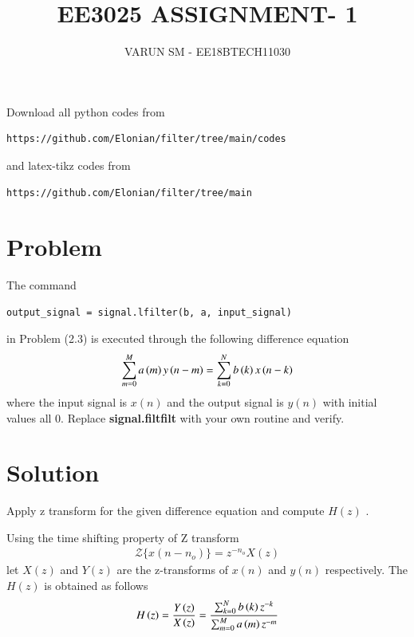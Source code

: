 \documentclass[journal,12pt,twocolumn]{IEEEtran}
\begin{document}
     \def\rightbox#1{\makebox[0in][r]{#1}}
     \def\centbox#1{\makebox[0in]{#1}}
     \def\topbox#1{\raisebox{-\baselineskip}[0in][0in]{#1}}
     \def\midbox#1{\raisebox{-0.5\baselineskip}[0in][0in]{#1}}
\vspace{3cm}
\title{EE3025 ASSIGNMENT- 1}
\author{VARUN SM - EE18BTECH11030}
\maketitle
\newpage
\bigskip
\renewcommand{\thefigure}{\theenumi}
\renewcommand{\thetable}{\theenumi}
Download all python codes from 
\begin{lstlisting}
https://github.com/Elonian/filter/tree/main/codes
\end{lstlisting}
%
and latex-tikz codes from 
%
\begin{lstlisting}
https://github.com/Elonian/filter/tree/main
\end{lstlisting}
\section{Problem}
The command
\begin{lstlisting}
output_signal = signal.lfilter(b, a, input_signal)
\end{lstlisting}
in Problem (2.3) is executed through the following difference equation
\begin{equation}
\label{ee18btech11030}
 \sum _{m=0}^{M}a\brak{m}y\brak{n-m}=\sum _{k=0}^{N}b\brak{k}x\brak{n-k}
\end{equation}
where the input signal is $x(n)$ and the output signal is $y(n)$ with initial values all 0. Replace
\textbf{signal.filtfilt} with your own routine and verify.
\section{Solution}
Apply z transform for the given difference equation and compute $H(z)$ .

Using the time shifting property of Z transform 
  \begin{align}
      {\mathcal {Z}}\{x(n-n_o)\} = z^{-n_o}X(z) 
  \end{align}
let  $X(z)$ and $Y(z)$ are the z-transforms of $x(n)$ and $y(n)$ respectively.
\newline
The $H(z)$ is obtained as follows
\begin{align}
\label{ee18btech11030_1}
    H\brak{z} = \frac{Y\brak{z}}{X\brak{z}} = \frac{\sum _{k=0}^{N}b\brak{k} z^{-k}}{\sum _{m=0}^{M}a\brak{m}z^{-m}}
\end{align}  
\end{document}
